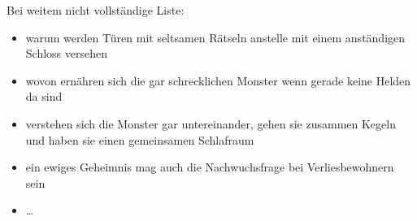 Bei weitem nicht vollständige Liste:
\begin{itemize}
\item warum werden Türen mit seltsamen Rätseln anstelle mit einem anständigen Schloss versehen
\item wovon ernähren sich die gar schrecklichen Monster wenn gerade keine Helden da sind
\item verstehen sich die Monster gar untereinander, gehen sie zusammen Kegeln und haben sie einen gemeinsamen Schlafraum
\item ein ewiges Geheimnis mag auch die Nachwuchsfrage bei Verliesbewohnern sein
\item \dots
\end{itemize}

 


